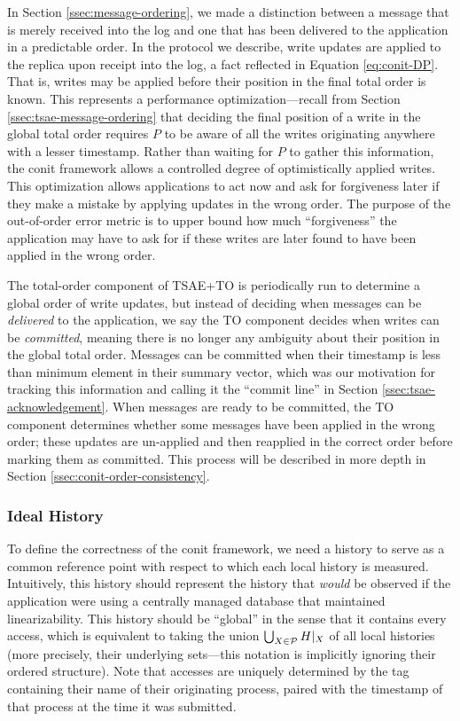 \documentclass[]             %
{NASA}                       %
\theoremstyle{definition}
\begin{document}
In Section \ref{ssec:message-ordering}, we made a distinction between
a message that is merely received into the log and one that has been
delivered to the application in a predictable order. In the protocol
we describe, write updates are applied to the replica upon receipt
into the log, a fact reflected in Equation \eqref{eq:conit-DP}. That
is, writes may be applied before their position in the final total
order is known. This represents a performance optimization---recall
from Section \ref{ssec:tsae-message-ordering} that deciding the final
position of a write in the global total order requires $P$ to be aware
of all the writes originating anywhere with a lesser timestamp. Rather
than waiting for $P$ to gather this information, the conit framework
allows a controlled degree of optimistically applied writes. This
optimization allows applications to act now and ask for forgiveness
later if they make a mistake by applying updates in the wrong
order. The purpose of the out-of-order error metric is to upper bound
how much ``forgiveness'' the application may have to ask for if these
writes are later found to have been applied in the wrong order.

The total-order component of TSAE+TO is periodically run to determine
a global order of write updates, but instead of deciding when messages
can be \emph{delivered} to the application, we say the TO component
decides when writes can be \emph{committed}, meaning there is no
longer any ambiguity about their position in the global total
order. Messages can be committed when their timestamp is less than
minimum element in their summary vector, which was our motivation for
tracking this information and calling it the ``commit line'' in
Section \ref{ssec:tsae-acknowledgement}. When messages are ready to be
committed, the TO component determines whether some messages have been
applied in the wrong order; these updates are un-applied and then
reapplied in the correct order before marking them as committed. This
process will be described in more depth in Section
\ref{ssec:conit-order-consistency}.

\subsubsection{Ideal History}

To define the correctness of the conit framework, we need a history to
serve as a common reference point with respect to which each local
history is measured. Intuitively, this history should represent the
history that \emph{would} be observed if the application were using a
centrally managed database that maintained linearizability. This
history should be ``global'' in the sense that it contains every
access, which is equivalent to taking the union
$\bigcup_{X \in \mathcal{P}} H|_{X}$ of all local histories
(more precisely, their underlying sets---this notation is implicitly
ignoring their ordered structure). Note that accesses are uniquely
determined by the tag containing their name of their originating
process, paired with the timestamp of that process at the time it was
submitted.
\end{document}
